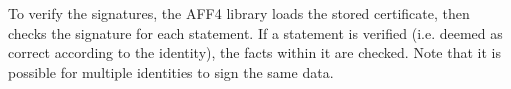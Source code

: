 \documentclass[10pt, conference]{IEEEtran}
\begin{document}
{{To verify the signatures, the AFF4 library loads the stored
certificate, then checks the signature for each statement. If a
statement is verified (i.e. deemed as correct according to the
identity), the facts within it are checked. Note that it is possible
for multiple identities to sign the same data.








}}
\end{document}

